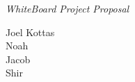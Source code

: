\documentclass[12pt]{article}
\begin{document}
\begin{center}
    \emph{\huge{WhiteBoard Project Proposal}}

    \large{
        Joel Kottas \\
        Noah \\
        Jacob \\
        Shir \\
    }
\end{center}
\end{document}
